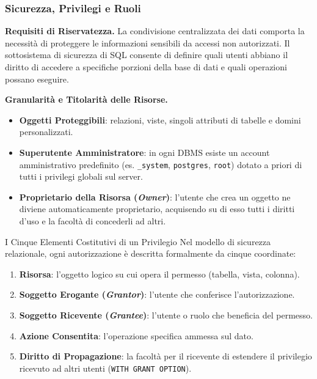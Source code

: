 \documentclass[12pt]{extarticle}
\begin{document}
\subsubsection{Sicurezza, Privilegi e Ruoli}
\noindent \textbf{Requisiti di Riservatezza.} La condivisione centralizzata dei dati comporta la necessità di proteggere le informazioni sensibili da accessi non autorizzati. Il sottosistema di sicurezza di SQL consente di definire quali utenti abbiano il diritto di accedere a specifiche porzioni della base di dati e quali operazioni possano eseguire.

\medskip
\noindent \textbf{Granularità e Titolarità delle Risorse.}
\begin{itemize}
    \item \textbf{Oggetti Proteggibili}: relazioni, viste, singoli attributi di tabelle e domini personalizzati.
    \item \textbf{Superutente Amministratore}: in ogni DBMS esiste un account amministrativo predefinito (es. \texttt{\_system}, \texttt{postgres}, \texttt{root}) dotato a priori di tutti i privilegi globali sul server.
    \item \textbf{Proprietario della Risorsa (\textit{Owner})}: l'utente che crea un oggetto ne diviene automaticamente proprietario, acquisendo su di esso tutti i diritti d'uso e la facoltà di concederli ad altri.
\end{itemize}

\begin{cbox}{I Cinque Elementi Costitutivi di un Privilegio}
\noindent Nel modello di sicurezza relazionale, ogni autorizzazione è descritta formalmente da cinque coordinate:
\begin{enumerate}
    \item \textbf{Risorsa}: l'oggetto logico su cui opera il permesso (tabella, vista, colonna).
    \item \textbf{Soggetto Erogante (\textit{Grantor})}: l'utente che conferisce l'autorizzazione.
    \item \textbf{Soggetto Ricevente (\textit{Grantee})}: l'utente o ruolo che beneficia del permesso.
    \item \textbf{Azione Consentita}: l'operazione specifica ammessa sul dato.
    \item \textbf{Diritto di Propagazione}: la facoltà per il ricevente di estendere il privilegio ricevuto ad altri utenti (\texttt{WITH GRANT OPTION}).
\end{enumerate}
\end{cbox}
\end{document}
